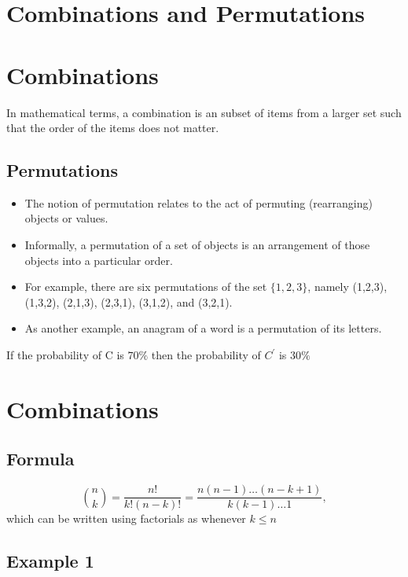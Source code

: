 \documentclass[12pt]{report}
\begin{document}
		\section*{Combinations and Permutations }
		\section*{Combinations}
		In mathematical terms, a combination is an subset of items from a larger set such that the order of the items does not matter.
		
		\subsection{Permutations}
		\Large
		\begin{itemize}
			\item The notion of permutation relates to the act of permuting (rearranging) objects or values. 
			\item Informally, a permutation of a set of objects is an arrangement of those objects into a particular order. 
			
			\item For example, there are six permutations of the set $\{1,2,3\}$, namely (1,2,3), (1,3,2), (2,1,3), (2,3,1), (3,1,2), and (3,2,1). 
			\item As another example, an anagram of a word is a permutation of its letters. 
			
		\end{itemize}
		
If the probability of C is $70 \%$ then the probability of $C^{\prime}$ is $30\%$		

\section*{Combinations}

\subsection*{Formula}
\[ \binom nk  = \frac{n!}{k!(n-k)!} = \frac{n(n-1)\ldots(n-k+1)}{k(k-1)\dots 1},\]
which can be written using factorials as  whenever $k\leq n$

\subsection*{Example 1}
\end{document}
